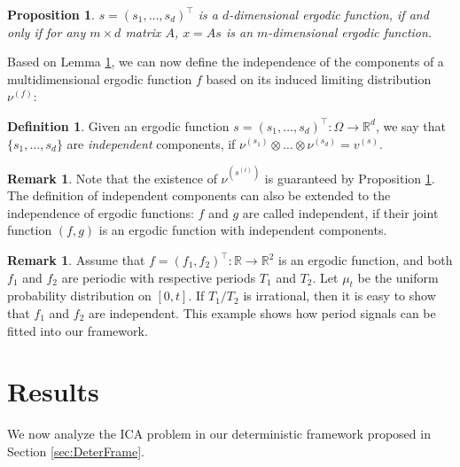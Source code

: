 \documentclass[twoside]{article}
\newcommand{\scom}[1]{s_{#1}}
\newcommand{\real}{\mathbb{R}}
\newtheorem{prop}[lemma]{Proposition}
\theoremstyle{definition}
\newtheorem{definition}[lemma]{Definition}
\newtheorem{remark}[lemma]{Remark}
\begin{document}
\begin{prop}\label{prop:comp}
$s = (\scom{1},\ldots,\scom{d})^{\top}$ is a $d$-dimensional ergodic function, if and only if 
 for any $m\times d$ matrix $A$, $x = A s$ is an $m$-dimensional ergodic function.
\end{prop}  
Based on Lemma \ref{prop:comp}, we can now define the independence of the components of a multidimensional ergodic function $f$ based on its induced limiting distribution $\nu^{(f)}$:
\begin{definition}
Given an ergodic function $s = (\scom{1},\ldots, \scom{d})^{\top}:\Omega \rightarrow \real^d$, 
we say that $\{\scom{1},\ldots, \scom{d}\}$ are \emph{independent} components, 
	if $\nu^{(\scom{1})}\otimes\ldots\otimes\nu^{(\scom{d})} = v^{(s)}$.
\end{definition}
\begin{remark}
Note that the existence of $\nu^{(s^{(i)})}$ is guaranteed by Proposition \ref{prop:comp}. 
The definition of independent components can also be extended to the independence of ergodic functions: 
$f$ and $g$ are called independent, if their joint function $(f,g)$ is an ergodic function with independent components. 
\end{remark}
\begin{remark}
Assume that $f = (f_1,f_2)^{\top}:\real\rightarrow\real^2$ is an ergodic function, and both $f_1$ and $f_2$ are periodic with respective periods $T_1$ and $T_2$. 
Let $\mu_t$ be the uniform probability distribution on $[0,t]$. 
 If $T_1/T_2$ is irrational, then it is easy to show that $f_1$ and $f_2$ are independent. 
 This example shows how period signals can be fitted into our framework.
\end{remark}

\section{Results}
\label{sec:Results}
We now analyze the ICA problem in our deterministic framework proposed in Section \ref{sec:DeterFrame}.
\end{document}
